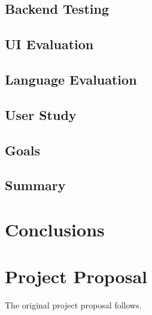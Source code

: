 \documentclass[12pt,twoside,notitlepage,xetex]{report}
\begin{document}

\section{Backend Testing}

\section{UI Evaluation}

\section{Language Evaluation}

\section{User Study}

\section{Goals}

\section{Summary}


\cleardoublepage
\chapter{Conclusions}





\cleardoublepage



\cleardoublepage

\appendix

\chapter{Project Proposal}

The original project proposal follows.


% 
\end{document}
